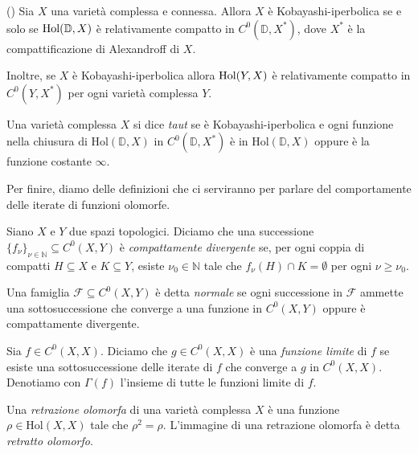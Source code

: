 \begin{prop} \label{alex}
    (\cite[Theorem 1.3]{A3}) Sia $X$ una varietà complessa e connessa. Allora $X$ è Kobayashi-iperbolica se e solo se $\textnormal{Hol}(\mathbb{D},X)$ è relativamente compatto in $C^0(\mathbb{D},X^*)$, dove $X^*$ è la compattificazione di Alexandroff di $X$.
    
    Inoltre, se $X$ è Kobayashi-iperbolica allora $\textnormal{Hol}(Y,X)$ è relativamente compatto in $C^0(Y,X^*)$ per ogni varietà complessa $Y$.
\end{prop}

\begin{defn}
    Una varietà complessa $X$ si dice \textit{taut} se è Kobayashi-iperbolica e ogni funzione nella chiusura di $\text{Hol}(\mathbb{D},X)$ in $C^0(\mathbb{D},X^*)$ è in $\text{Hol}(\mathbb{D},X)$ oppure è la funzione costante $\infty$.
\end{defn}

Per finire, diamo delle definizioni che ci serviranno per parlare del comportamente delle iterate di funzioni olomorfe.

\begin{defn}
    Siano $X$ e $Y$ due spazi topologici. Diciamo che una successione $\{f_{\nu}\}_{\nu \in \mathbb{N}} \subseteq C^0(X,Y)$ è \textit{compattamente divergente} se, per ogni coppia di compatti $H\subseteq X$ e $K\subseteq Y$, esiste $\nu_0 \in \mathbb{N}$ tale che $f_\nu(H)\cap K=\emptyset$ per ogni $\nu \ge \nu_0$.

    Una famiglia $\mathcal{F} \subseteq C^0(X,Y)$ è detta \textit{normale} se ogni successione in $\mathcal{F}$ ammette una sottosuccessione che converge a una funzione in $C^0(X,Y)$ oppure è compattamente divergente.
\end{defn}

\begin{defn}
    Sia $f\in C^0(X,X)$. Diciamo che $g\in C^0(X,X)$ è una \textit{funzione limite} di $f$ se esiste una sottosuccessione delle iterate di $f$ che converge a $g$ in $C^0(X,X)$. Denotiamo con $\Gamma(f)$ l'insieme di tutte le funzioni limite di $f$.
\end{defn}

\begin{defn}
    Una \textit{retrazione olomorfa} di una varietà complessa $X$ è una funzione $\rho\in\text{Hol}(X,X)$ tale che $\rho^2=\rho$. L'immagine di una retrazione olomorfa è detta \textit{retratto olomorfo}.
\end{defn}